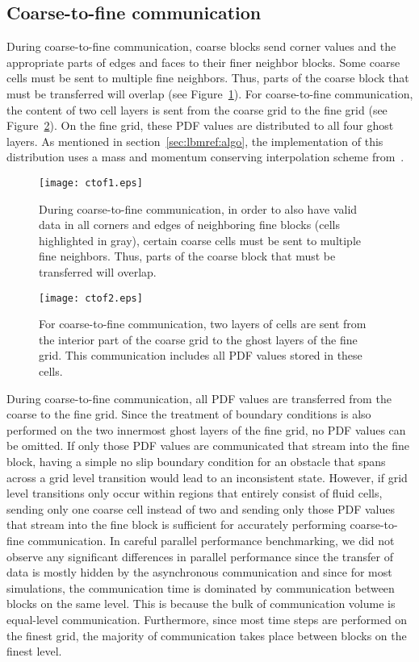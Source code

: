 \documentclass[final,leqno,onefignum,onetabnum]{siamltex1213}
\begin{document}
\subsection{Coarse-to-fine communication}\label{sec:lbmref:ctf}

During coarse-to-fine communication, coarse blocks send corner values and the appropriate parts of edges and faces to their finer neighbor blocks.
Some coarse cells must be sent to multiple fine neighbors.
Thus, parts of the coarse block that must be transferred will overlap (see Figure~\ref{fig:coarse_to_fine_2}).
For coarse-to-fine communication, the content of two cell layers is sent from the coarse grid to the fine grid (see Figure~\ref{fig:coarse_to_fine_1}).
On the fine grid, these PDF values are distributed to all four ghost layers.
As mentioned in section~\ref{sec:lbmref:algo}, the implementation of this distribution uses a mass and momentum conserving interpolation scheme from~\cite{Chen2006}.

\begin{figure}[tbp]
  \centering
  \texttt{[image: ctof1.eps]}
  \caption{During coarse-to-fine communication, in order to also have valid data in all corners and edges of neighboring fine blocks (cells highlighted in gray),
certain coarse cells must be sent to multiple fine neighbors. Thus, parts of the coarse block that must be transferred will overlap.}
  \label{fig:coarse_to_fine_2}
\end{figure}

\begin{figure}[tbp]
  \centering
  \texttt{[image: ctof2.eps]}
  \caption{For coarse-to-fine communication, two layers of cells are sent from the interior part of the coarse grid to the ghost layers of the fine grid.
This communication includes all PDF values stored in these cells.}
  \label{fig:coarse_to_fine_1}
\end{figure}

During coarse-to-fine communication, all PDF values are transferred from the coarse to the fine grid.
Since the treatment of boundary conditions is also performed on the two innermost ghost layers of the fine grid, no PDF values can be omitted.
If only those PDF values are communicated that stream into the fine block, having a simple no slip boundary condition for an obstacle that
spans across a grid level transition would lead to an inconsistent state.
However, if grid level transitions only occur within regions that entirely consist of fluid cells,
sending only one coarse cell instead of two and sending only those PDF values that stream into the fine block is sufficient for accurately performing coarse-to-fine communication.
In careful parallel performance benchmarking,
we did not observe any significant differences in parallel performance since the transfer of data is
mostly hidden by the asynchronous communication and since for most simulations,
the communication time is dominated by communication between blocks on the same level.
This is because the bulk of communication volume is equal-level communication.
Furthermore, since most time steps are performed on the finest grid, the majority of communication takes place between blocks on the finest level.
\end{document}
